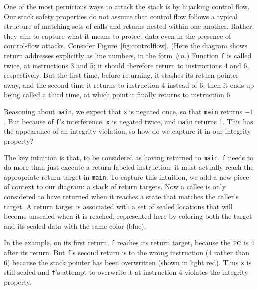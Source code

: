 \documentclass[acmsmall,review,anonymous]{acmart}\settopmatter{printfolios=true,printccs=false,printacmref=false}
\begin{document}
\label{sec:controlflow} %

One of the most pernicious ways to attack the stack is by hijacking control flow.
Our stack safety properties do not assume that control flow follows a typical structure
of matching sets of calls and returns nested within one another.
Rather, they aim to capture what it means to protect data even in the presence of control-flow attacks.
Consider Figure~\ref{fig:controlflow}.
(Here the diagram shows return addresses explicitly as line numbers, in the
form $\#n$.)
Function {\tt f} is called twice, at instructions 3 and 5; it should therefore return to instructions
4 and 6, respectively. But the first time, before returning, it stashes its
return pointer away, and the second time it returns to instruction 4 instead of 6; then it ends
up being called a third time, at which point it finally returns to instruction 6.

Reasoning about {\tt main}, we expect that {\tt x} is negated once, so that {\tt main} returns
$-1$. But because of {\tt f}'s interference, {\tt x} is negated twice, and {\tt main} returns 1.
This has the appearance of an integrity violation, so how do we capture it in our
integrity property?

The key intuition is that, to be considered as having returned to {\tt main}, {\tt f} needs
to do more than just execute a return-labeled instruction: it must actually reach the
appropriate return target in {\tt main}.
To capture this intuition, we add a new piece of context to our diagram:
a stack of return targets.  Now a callee is
only considered to have returned when it reaches a state that matches the caller's target.
A return target is associated with a set of sealed locations that will become unsealed
when it is reached, represented here by coloring both the target and its sealed data with the
same color (blue). 

In the example, on its first return, {\tt f} reaches its return target, because the
\(\textsc{pc}\) is 4 after its return. But {\tt f}'s second return is to the wrong instruction
(4 rather than 6) because the stack pointer has been overwritten (shown in light red).
Thus {\tt x} is still sealed and {\tt f}'s attempt to overwrite it at instruction 4
violates the integrity property.
\end{document}
